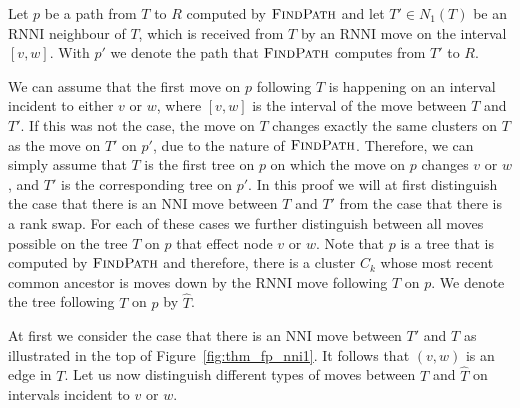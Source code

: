 \documentclass{amsart}
\newcommand{\rnni}{\mathrm{RNNI}}
\newcommand{\findpath}{\textsc{FindPath}}
\newcommand{\nni}{\mathrm{NNI}}
\begin{document}
\proof
Let $p$ be a path from $T$ to $R$ computed by $\findpath$ and let $T' \in N_1(T)$ be an $\rnni$ neighbour of $T$, which is received from $T$ by an $\rnni$ move on the interval $[v,w]$.
With $p'$ we denote the path that $\findpath$ computes from $T'$ to $R$.

We can assume that the first move on $p$ following $T$ is happening on an interval incident to either $v$ or $w$, where $[v,w]$ is the interval of the move between $T$ and $T'$.
If this was not the case, the move on $T$ changes exactly the same clusters on $T$ as the move on $T'$ on $p'$, due to the nature of $\findpath$.
Therefore, we can simply assume that $T$ is the first tree on $p$ on which the move on $p$ changes $v$ or $w$, and $T'$ is the corresponding tree on $p'$.
In this proof we will at first distinguish the case that there is an $\nni$ move between $T$ and $T'$ from the case that there is a rank swap.
For each of these cases we further distinguish between all moves possible on the tree $T$ on $p$ that effect node $v$ or $w$.
Note that $p$ is a tree that is computed by $\findpath$ and therefore, there is a cluster $C_k$ whose most recent common ancestor is moves down by the $\rnni$ move following $T$ on $p$.
We denote the tree following $T$ on $p$ by $\hat T$.

At first we consider the case that there is an $\nni$ move between $T'$ and $T$ as illustrated in the top of Figure~\ref{fig:thm_fp_nni1}.
It follows that $(v,w)$ is an edge in $T$.
Let us now distinguish different types of moves between $T$ and $\hat T$ on intervals incident to $v$ or $w$.
\end{document}
